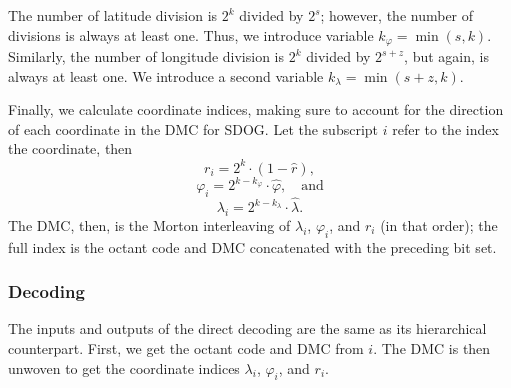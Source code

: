 The number of latitude division is $2^k$ divided by $2^s$; however, the number of divisions is always at least one.
Thus, we introduce variable $k_\varphi = \min ( s, k )$.
Similarly, the number of longitude division is $2^k$ divided by $2^{s+z}$, but again, is always at least one.
We introduce a second variable $k_\lambda = \min ( s + z, k )$.


Finally, we calculate coordinate indices, making sure to account for the direction of each coordinate in the DMC for SDOG.
Let the subscript $i$ refer to the index the coordinate, then
%
\begin{equation*}
r_i = 2^k \cdot ( 1 - \hat{r} ),
\end{equation*}
%
\begin{equation*}
\varphi_i = 2^{k - k_\varphi} \cdot \hat{\varphi}, \quad \text{and}
\end{equation*}
%
\begin{equation*}
\lambda_i = 2^{k - k_\lambda} \cdot \hat{\lambda}.
\end{equation*}
%
The DMC, then, is the Morton interleaving of $\lambda_i$, $\varphi_i$, and $r_i$ (in that order); the full index is the octant code and DMC concatenated with the preceding bit set.


\subsubsection{Decoding}
The inputs and outputs of the direct decoding are the same as its hierarchical counterpart.
First, we get the octant code and DMC from $i$.
The DMC is then unwoven to get the coordinate indices $\lambda_i$, $\varphi_i$, and $r_i$.


